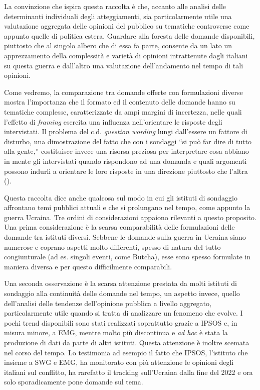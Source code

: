 \documentclass[
  openany]{book}
\begin{document}
La convinzione che ispira questa raccolta è che, accanto alle analisi delle determinanti individuali degli atteggiamenti, sia particolarmente utile una valutazione aggregata delle opinioni del pubblico su tematiche controverse come appunto quelle di politica estera. Guardare alla foresta delle domande disponibili, piuttosto che al singolo albero che di essa fa parte, consente da un lato un apprezzamento della complessità e varietà di opinioni intrattenute dagli italiani su questa guerra e dall'altro una valutazione dell'andamento nel tempo di tali opinioni.

Come vedremo, la comparazione tra domande offerte con formulazioni diverse mostra l'importanza che il formato ed il contenuto delle domande hanno su tematiche complesse, caratterizzate da ampi margini di incertezza, nelle quali l'effetto di \emph{framing} esercita una influenza nell'orientare le risposte degli intervistati. Il problema del c.d. \emph{question wording} lungi dall'essere un fattore di disturbo, una dimostrazione del fatto che con i sondaggi ``si può far dire di tutto alla gente,'' costituisce invece una risorsa preziosa per interpretare cosa abbiano in mente gli intervistati quando rispondono ad una domanda e quali argomenti possono indurli a orientare le loro risposte in una direzione piuttosto che l'altra (\citet{Sudman-Bradburn1974}).

Questa raccolta dice anche qualcosa sul modo in cui gli istituti di sondaggio affrontano temi pubblici attuali e che si prolungano nel tempo, come appunto la guerra Ucraina. Tre ordini di considerazioni appaiono rilevanti a questo proposito. Una prima considerazione è la scarsa comparabilità delle formulazioni delle domande tra istituti diversi. Sebbene le domande sulla guerra in Ucraina siano numerose e coprano aspetti molto differenti, spesso di natura del tutto congiunturale (ad es. singoli eventi, come Butcha), esse sono spesso formulate in maniera diversa e per questo difficilmente comparabili.

Una seconda osservazione è la scarsa attenzione prestata da molti istituti di sondaggio alla continuità delle domande nel tempo, un aspetto invece, quello dell'analisi delle tendenze dell'opinione pubblica a livello aggregato, particolarmente utile quando si tratta di analizzare un fenomeno che evolve. I pochi trend disponibili sono stati realizzati soprattutto grazie a IPSOS e, in misura minore, a EMG, mentre molto più discontinua e \emph{ad hoc} è stata la produzione di dati da parte di altri istituti. Questa attenzione è inoltre scemata nel corso del tempo. Lo testimonia ad esempio il fatto che IPSOS, l'istituto che insieme a SWG e EMG, ha monitorato con più attenzione le opinioni degli italiani sul conflitto, ha rarefatto il tracking sull'Ucraina dalla fine del 2022 e ora solo sporadicamente pone domande sul tema.
\end{document}
